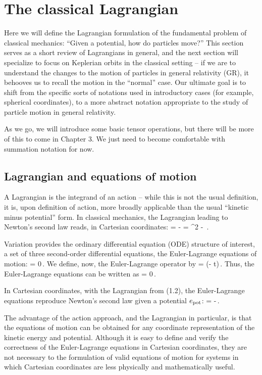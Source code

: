 \section{The classical Lagrangian}
Here we will define the Lagrangian formulation of the fundamental problem of classical mechanics: ``Given a potential, how do particles move?'' This section serves as a short review of Lagrangians in general, and the next section will specialize to focus on Keplerian orbits in the classical setting -- if we are to understand the changes to the motion of particles in general relativity (GR), it behooves us to recall the motion in the ``normal'' case. Our ultimate goal is to shift from the specific sorts of notations used in introductory cases (for example, spherical coordinates), to a more abstract notation appropriate to the study of particle motion in general relativity.

As we go, we will introduce some basic tensor operations, but there will be more of this to come in Chapter 3. We just need to become comfortable with summation notation for now.


\subsection{Lagrangian and equations of motion}
A Lagrangian is the integrand of an action -- while this is not the usual definition, it is, upon definition of action, more broadly applicable than the usual ``kinetic minus potential'' form. In classical mechanics, the Lagrangian leading to Newton's second law reads, in Cartesian coordinates:
\beq
\lag = \ken - \pen
     = \mass\vel^2 - \pen\,.
\eeq

Variation provides the ordinary differential equation (ODE) structure of interest, a set of three second-order differential equations, the Euler-Lagrange equations of motion:
\beq
\eleq\pos\vel = 0\,.
\eeq
We define, now, the Euler-Lagrange operator by
\beq
\elop\pos\vel = \left(\ipd\pos - \iod t\ipd\vel\right)\,.
\eeq
Thus, the Euler-Lagrange equations can be written as
\beq
\elop\pos\vel\lag = 0\,.
\eeq


In Cartesian coordinates, with the Lagrangian from (1.2), the Euler-Lagrange equations reproduce Newton's second law given a potential $e_\text{pot}$:
\beq
\mass\acc = -\grad\pen\,.
\eeq

The advantage of the action approach, and the Lagrangian in particular, is that the equations of motion can be obtained for any coordinate representation of the kinetic energy and potential. Although it is easy to define and verify the correctness of the Euler-Lagrange equations in Cartesian coordinates, they are not necessary to the formulation of valid equations of motion for systems in which Cartesian coordinates are less physically and mathematically useful.

